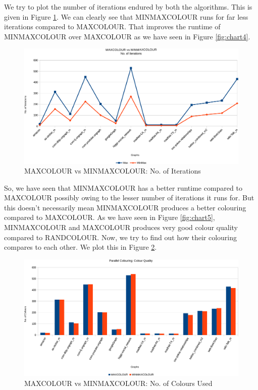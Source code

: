 \documentclass[MTech]{iitmdiss}
\begin{document}
We try to plot the number of iterations endured by both the algorithms. This is given in Figure \ref{fig:chart1}. We can clearly see that MINMAXCOLOUR runs for far less iterations compared to MAXCOLOUR. That improves the runtime of MINMAXCOLOUR over MAXCOLOUR as we have seen in Figure \ref{fig:chart4}.

\begin{figure}[h]
    \centering
    \includegraphics[width=\textwidth,keepaspectratio=true]{chartNewest1.pdf}
    \caption{
        MAXCOLOUR vs MINMAXCOLOUR: No. of Iterations
    }
    \label{fig:chart1}
\end{figure}

So, we have seen that MINMAXCOLOUR has a better runtime compared to MAXCOLOUR possibly owing to the lesser number of iterations it runs for. But this doesn't necessarily mean MINMAXCOLOUR produces a better colouring compared to MAXCOLOUR. As we have seen in Figure \ref{fig:chart5}, MINMAXCOLOUR and MAXCOLOUR produces very good colour quality compared to RANDCOLOUR. Now, we try to find out how their colouring compares to each other. We plot this in 
Figure \ref{fig:chart6}.

\begin{figure}[h]
    \centering
    \includegraphics[width=\textwidth,keepaspectratio=true]{chartNewest6.pdf}
    \caption{
        MAXCOLOUR vs MINMAXCOLOUR: No. of Colours Used
    }
    \label{fig:chart6}
\end{figure}
\end{document}
